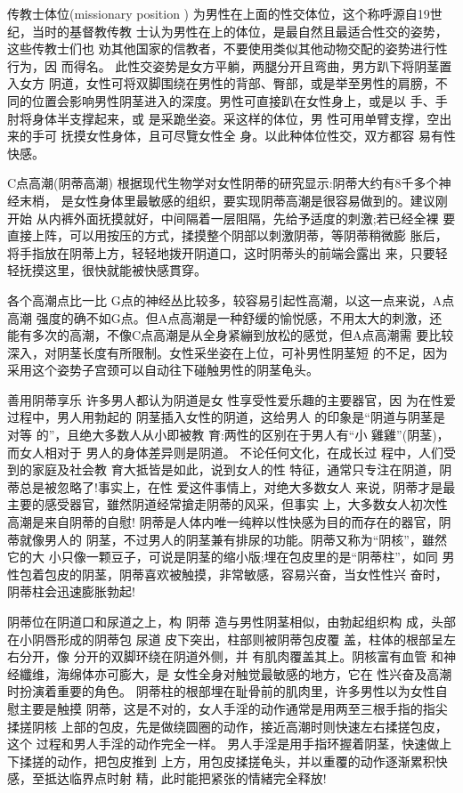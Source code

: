 \documentclass[12pt,UTF8]{ctexbook}
\begin{document}
传教士体位(missionary position )
为男性在上面的性交体位，这个称呼源自19世纪，当时的基督教传教
士认为男性在上的体位，是最自然且最适合性交的姿势，这些传教士们也
劝其他国家的信教者，不要使用类似其他动物交配的姿势进行性行为，因
而得名。
此性交姿势是女方平躺，两腿分开且弯曲，男方趴下将阴茎置入女方
阴道，女性可将双脚围绕在男性的背部、臀部，或是举至男性的肩膀，不
同的位置会影响男性阴茎进入的深度。男性可直接趴在女性身上，或是以
手、手肘将身体半支撑起来，或
是采跪坐姿。采这样的体位，男
性可用单臂支撑，空出来的手可
抚摸女性身体，且可尽覽女性全
身。以此种体位性交，双方都容
易有性快感。

C点高潮(阴蒂高潮)
根据现代生物学对女性阴蒂的研究显示:阴蒂大约有8千多个神经末梢，
是女性身体里最敏感的组织，要实现阴蒂高潮是很容易做到的。建议刚开始
从内裤外面抚摸就好，中间隔着一层阻隔，先给予适度的刺激;若已经全裸
要直接上阵，可以用按压的方式，揉摸整个阴部以刺激阴蒂，等阴蒂稍微膨
胀后，将手指放在阴蒂上方，轻轻地拨开阴道口，这时阴蒂头的前端会露出
来，只要轻轻抚摸这里，很快就能被快感貫穿。

各个高潮点比一比
G点的神经丛比较多，较容易引起性高潮，以这一点来说，A点高潮
强度的确不如G点。但A点高潮是一种舒缓的愉悦感，不用太大的刺激，还
能有多次的高潮，不像C点高潮是从全身紧繃到放松的感觉，但A点高潮需
要比较深入，对阴茎长度有所限制。女性采坐姿在上位，可补男性阴茎短
的不足，因为采用这个姿势子宫颈可以自动往下碰触男性的阴茎龟头。

善用阴蒂享乐
许多男人都认为阴道是女
性享受性爱乐趣的主要器官，因
为在性爱过程中，男人用勃起的
阴茎插入女性的阴道，这给男人
的印象是“阴道与阴茎是对等
的”，且绝大多数人从小即被教
育:两性的区别在于男人有“小
雞雞”(阴茎)，而女人相对于
男人的身体差异则是阴道。
不论任何文化，在成长过
程中，人们受到的家庭及社会教
育大抵皆是如此，说到女人的性
特征，通常只专注在阴道，阴蒂总是被忽略了!事实上，在性
爱这件事情上，对绝大多数女人
来说，阴蒂才是最主要的感受器官，雖然阴道经常搶走阴蒂的风采，但事实
上，大多数女人初次性高潮是来自阴蒂的自慰!
阴蒂是人体内唯一纯粹以性快感为目的而存在的器官，阴蒂就像男人的
阴茎，不过男人的阴茎兼有排尿的功能。阴蒂又称为“阴核”，雖然它的大
小只像一颗豆子，可说是阴茎的缩小版;埋在包皮里的是“阴蒂柱”，如同
男性包着包皮的阴茎，阴蒂喜欢被触摸，非常敏感，容易兴奋，当女性性兴
奋时，阴蒂柱会迅速膨胀勃起!

阴蒂位在阴道口和尿道之上，构
阴蒂
造与男性阴茎相似，由勃起组织构
成，头部在小阴唇形成的阴蒂包
尿道
皮下突出，柱部则被阴蒂包皮覆
盖，柱体的根部呈左右分开，像
分开的双脚环绕在阴道外侧，并
有肌肉覆盖其上。阴核富有血管
和神经纖维，海绵体亦可膨大，是
女性全身对触觉最敏感的地方，它在
性兴奋及高潮时扮演着重要的角色。
阴蒂柱的根部埋在耻骨前的肌肉里，许多男性以为女性自慰主要是触摸
阴蒂，这是不对的，女人手淫的动作通常是用两至三根手指的指尖揉搓阴核
上部的包皮，先是做绕圆圈的动作，接近高潮时则快速左右揉搓包皮，这个
过程和男人手淫的动作完全一样。
男人手淫是用手指环握着阴茎，快速做上下揉搓的动作，把包皮推到
上方，用包皮揉搓龟头，并以重覆的动作逐渐累积快感，至抵达临界点时射
精，此时能把紧张的情緒完全释放!
\end{document}
